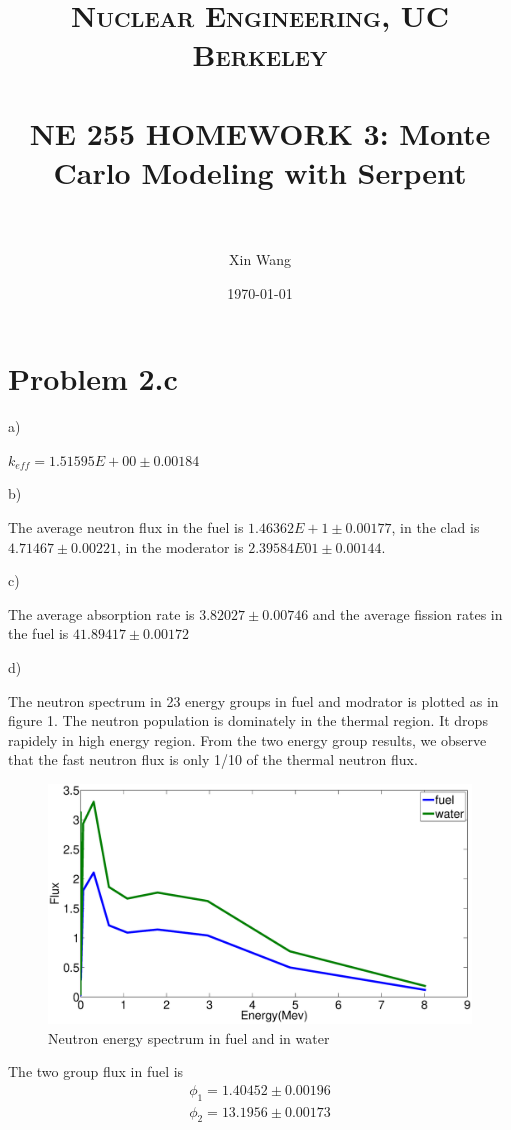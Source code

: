 \documentclass[a4paper, 12pt]{article} %
\title{ 
\normalfont \normalsize 
\textsc{Nuclear Engineering, UC Berkeley} \\ [25pt] %
\horrule{0.5pt} \\[0.4cm] %
\huge NE 255 HOMEWORK 3: Monte Carlo Modeling with Serpent \\  %
\horrule{2pt} \\[0.5cm] %
}
\author{Xin Wang} %
\date{\normalsize\today} %
\begin{document}
\section*{Problem 2.c}

a)

$k_{eff} = 1.51595E+00 \pm 0.00184$

b)

The average neutron flux in the fuel is $1.46362E+1 \pm 0.00177$, in the clad is $4.71467 \pm 0.00221$, in the moderator is $2.39584E01 \pm 0.00144$.

c)

The average absorption rate is $3.82027 \pm 0.00746$ and the average fission rates in the fuel is $41.89417 \pm 0.00172$

d)

The neutron spectrum in 23 energy groups in fuel and modrator is plotted as in figure 1. The neutron population is dominately in the thermal region. It drops rapidely in high energy region. From the two energy group results, we observe that the fast neutron flux is only 1/10 of the thermal neutron flux.  

\begin{figure}
\includegraphics[width = \textwidth]{energy_23_fuel.eps}

\caption{Neutron energy spectrum in fuel and in water}
\label{neutron_spectrum_u02}
\end{figure}

The two group flux in fuel is 
\begin{eqnarray}
\phi_1 = 1.40452 \pm 0.00196 \nonumber\\
\phi_2 = 13.1956 \pm 0.00173 \nonumber
\end{eqnarray}
\end{document}
